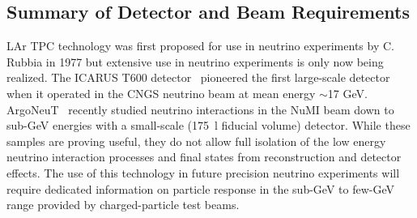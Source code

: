 \subsection{Summary of Detector and Beam Requirements }
\label{detbeam_main}

LAr TPC technology was first proposed for use in neutrino experiments by C. Rubbia in 1977
\cite{CRubbia} but extensive use in neutrino experiments is only now being realized. 
The ICARUS T600 detector~\cite{icarus_mainref} pioneered the first large-scale detector when it operated in the CNGS 
neutrino beam at mean energy $\sim$17 GeV. ArgoNeuT~\cite{argoneut1}\cite{argoneut2} recently studied 
neutrino interactions in the NuMI beam down to sub-GeV energies with a small-scale (175~l fiducial volume) detector. 
While these samples are proving useful, they do not allow full isolation of
the low energy neutrino interaction processes
and final states from reconstruction and detector effects. 
The use of this technology in future precision neutrino experiments will require dedicated 
information on particle response
in the sub-GeV to few-GeV range provided by charged-particle test beams. 

